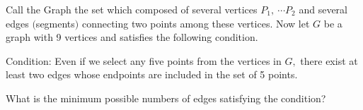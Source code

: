 Call the Graph the set which composed of several vertices $P_1,\ \cdots P_2$ and several edges $($segments$)$ connecting two points among these vertices. Now let $G$ be a graph with 9 vertices and satisfies the following condition.

Condition: Even if we select any five points from the vertices in $G,$ there exist at least two edges whose endpoints are included in the set of 5 points.

What is the minimum possible numbers of edges satisfying the condition?